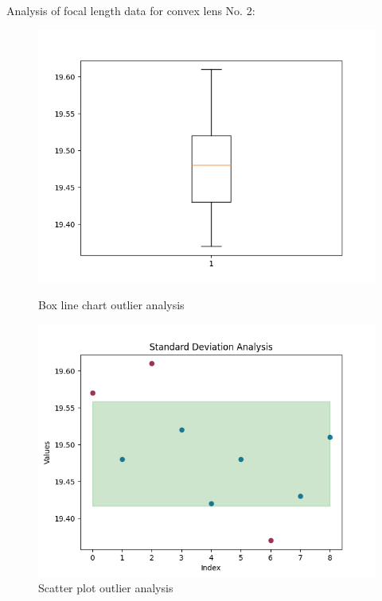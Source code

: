 \documentclass[UTF8]{article}
\begin{document}
        Analysis of focal length data for convex lens No. 2:
        \begin{figure}[H]
                  			\begin{minipage}[t]{0.5\linewidth}
                  				\centering
                  				\includegraphics[clip,scale=0.45,trim={0 0 0 0}]{fig/fig15.png}
                  				\caption{Box line chart outlier analysis}
                  				\label{figure.15}
                  			\end{minipage}
                  			\begin{minipage}[t]{0.5\linewidth}
                  				\centering
                  				\includegraphics[clip,scale=0.45,trim={0 0 0 0}]{fig/fig16.png}
                  				\caption{Scatter plot outlier analysis}
                  				\label{figure.16}
                  			\end{minipage}
                  		\end{figure}
                  		
\end{document}
